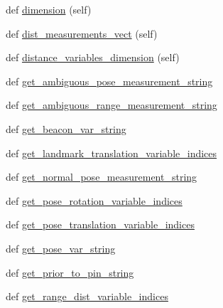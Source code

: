 \begin{DoxyCompactItemize}
\item
def \hyperlink{classfactor__graph_1_1factor__graph_1_1FactorGraphData_ac61870d9ed550e14ffdd8a34817233ec}{dimension} (self)
\item
def \hyperlink{classfactor__graph_1_1factor__graph_1_1FactorGraphData_a6ce34c6ad605f56132e8f9fc240950e6}{dist\+\_\+measurements\+\_\+vect} (self)
\item
def \hyperlink{classfactor__graph_1_1factor__graph_1_1FactorGraphData_a2a84bd7c6b4da21ca69a31cfaad95b7f}{distance\+\_\+variables\+\_\+dimension} (self)
\item
def \hyperlink{classfactor__graph_1_1factor__graph_1_1FactorGraphData_a8c2a40e3e53902b4391a4210e5177500}{get\+\_\+ambiguous\+\_\+pose\+\_\+measurement\+\_\+string}
\item
def \hyperlink{classfactor__graph_1_1factor__graph_1_1FactorGraphData_a1a62119fa7182d61c4d200fca9eb9012}{get\+\_\+ambiguous\+\_\+range\+\_\+measurement\+\_\+string}
\item
def \hyperlink{classfactor__graph_1_1factor__graph_1_1FactorGraphData_abaeb7aa52e16d4999735201e70141d5b}{get\+\_\+beacon\+\_\+var\+\_\+string}
\item
def \hyperlink{classfactor__graph_1_1factor__graph_1_1FactorGraphData_af3770b75707cb9f2989db50f4337d62a}{get\+\_\+landmark\+\_\+translation\+\_\+variable\+\_\+indices}
\item
def \hyperlink{classfactor__graph_1_1factor__graph_1_1FactorGraphData_ae081a49472d505e94a46d142a12b03f8}{get\+\_\+normal\+\_\+pose\+\_\+measurement\+\_\+string}
\item
def \hyperlink{classfactor__graph_1_1factor__graph_1_1FactorGraphData_a14963f0d7b603aac17db252a63b6caa2}{get\+\_\+pose\+\_\+rotation\+\_\+variable\+\_\+indices}
\item
def \hyperlink{classfactor__graph_1_1factor__graph_1_1FactorGraphData_a60fe097a8da2f944233df631230da894}{get\+\_\+pose\+\_\+translation\+\_\+variable\+\_\+indices}
\item
def \hyperlink{classfactor__graph_1_1factor__graph_1_1FactorGraphData_a8e589a1d250f08b735011209ef431e56}{get\+\_\+pose\+\_\+var\+\_\+string}
\item
def \hyperlink{classfactor__graph_1_1factor__graph_1_1FactorGraphData_a8ecc82f23349afca78226c16683adf40}{get\+\_\+prior\+\_\+to\+\_\+pin\+\_\+string}
\item
def \hyperlink{classfactor__graph_1_1factor__graph_1_1FactorGraphData_a9a3dff95626380e9f55a414a9326c29f}{get\+\_\+range\+\_\+dist\+\_\+variable\+\_\+indices}
\item

\end{DoxyCompactItemize}
